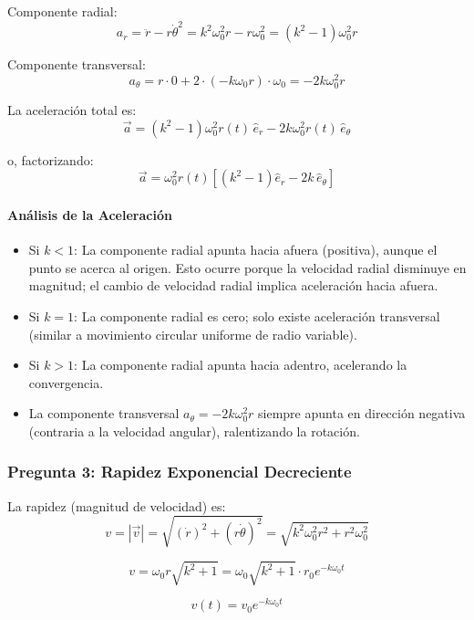 \begin{sol}
Componente radial:
$$a_r = \ddot{r} - r\dot{\theta}^2 = k^2 \omega_0^2 r - r \omega_0^2 = (k^2 - 1) \omega_0^2 r$$

Componente transversal:
$$a_\theta = r \cdot 0 + 2 \cdot (-k\omega_0 r) \cdot \omega_0 = -2k\omega_0^2 r$$

La aceleración total es:
\begin{equation}
\boxed{\vec{a} = (k^2 - 1) \omega_0^2 r(t) \, \hat{e}_r - 2k\omega_0^2 r(t) \, \hat{e}_\theta}
\end{equation}

o, factorizando:
\begin{equation}
\vec{a} = \omega_0^2 r(t) \left[ (k^2 - 1) \hat{e}_r - 2k \, \hat{e}_\theta \right]
\end{equation}

\paragraph{Análisis de la Aceleración}

\begin{itemize}
    \item Si $k < 1$: La componente radial apunta hacia afuera (positiva), aunque el punto se acerca al origen. Esto ocurre porque la velocidad radial disminuye en magnitud; el cambio de velocidad radial implica aceleración hacia afuera.
    \item Si $k = 1$: La componente radial es cero; solo existe aceleración transversal (similar a movimiento circular uniforme de radio variable).
    \item Si $k > 1$: La componente radial apunta hacia adentro, acelerando la convergencia.
    \item La componente transversal $a_\theta = -2k\omega_0^2 r$ siempre apunta en dirección negativa (contraria a la velocidad angular), ralentizando la rotación.
\end{itemize}

\subsubsection*{Pregunta 3: Rapidez Exponencial Decreciente}

La rapidez (magnitud de velocidad) es:
$$v = |\vec{v}| = \sqrt{(\dot{r})^2 + (r\dot{\theta})^2} = \sqrt{k^2\omega_0^2 r^2 + r^2 \omega_0^2}$$

$$v = \omega_0 r \sqrt{k^2 + 1} = \omega_0 \sqrt{k^2 + 1} \cdot r_0 e^{-k\omega_0 t}$$

\begin{equation}
\boxed{v(t) = v_0 e^{-k\omega_0 t}}
\end{equation}


\end{sol}
